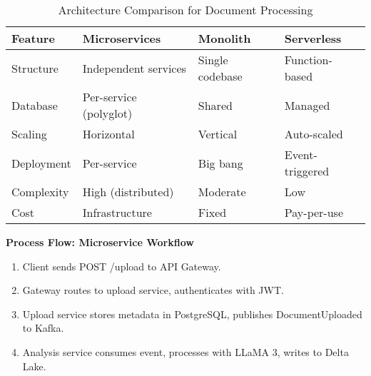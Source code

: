 \documentclass[11pt]{article}
\begin{document}
\begin{table}[h]
    \centering
    \begin{tabular}{p{3cm}p{4cm}p{4cm}p{4cm}}
        \toprule
        \textbf{Feature} & \textbf{Microservices} & \textbf{Monolith} & \textbf{Serverless} \\
        \midrule
        Structure & Independent services & Single codebase & Function-based \\
        Database & Per-service (polyglot) & Shared & Managed \\
        Scaling & Horizontal & Vertical & Auto-scaled \\
        Deployment & Per-service & Big bang & Event-triggered \\
        Complexity & High (distributed) & Moderate & Low \\
        Cost & Infrastructure & Fixed & Pay-per-use \\
        \bottomrule
    \end{tabular}
    \caption{Architecture Comparison for Document Processing}
\end{table}

\begin{processflow}
\textbf{Process Flow: Microservice Workflow}\newline
\begin{enumerate}
    \item Client sends POST /upload to API Gateway.
    \item Gateway routes to upload service, authenticates with JWT.
    \item Upload service stores metadata in PostgreSQL, publishes DocumentUploaded to Kafka.
    \item Analysis service consumes event, processes with LLaMA 3, writes to Delta Lake.
\end{enumerate}
\end{processflow}
\end{document}
